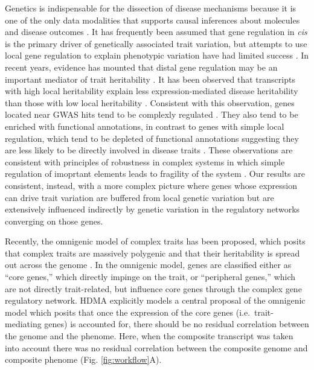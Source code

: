 \documentclass[
]{article}
\begin{document}
Genetics is indispensable for the dissection of disease mechanisms
because it is one of the only data modalities that supports causal
inferences about molecules and disease outcomes \cite{pmid38632401, 
pmid27855690}. It has frequently been assumed that gene regulation in
\textit{cis} is the primary driver of genetically associated trait
variation, but attempts to use local gene regulation to explain
phenotypic variation have had limited success
\cite{pmid32912663, pmid36515579}. In recent years, evidence has mounted
that distal gene regulation may be an important mediator of trait
heritability \cite{pmid32424349, 
pmid37857933, pmid31051098}. It has been observed that transcripts with
high local heritability explain less expression-mediated disease
heritability than those with low local heritability \cite{pmid32424349}.
Consistent with this observation, genes located near GWAS hits tend to
be complexly regulated \cite{pmid37857933}. They also tend to be
enriched with functional annotations, in contrast to genes with simple
local regulation, which tend to be depleted of functional annotations
suggesting they are less likely to be directly involved in disease
traits \cite{pmid37857933}. These observations are consistent with
principles of robustness in complex systems in which simple regulation
of imoprtant elements leads to fragility of the system
\cite{pmid29782925, pmid12082173, pmid27304973}. Our results are
consistent, instead, with a more complex picture where genes whose
expression can drive trait variation are buffered from local genetic
variation but are extensively influenced indirectly by genetic variation
in the regulatory networks converging on those genes.

Recently, the omnigenic model of complex traits has been proposed, which
posits that complex traits are massively polygenic and that their
heritability is spread out across the genome \cite{pmid28622505}. In the
omnigenic model, genes are classified either as ``core genes,'' which
directly impinge on the trait, or ``peripheral genes,'' which are not
directly trait-related, but influence core genes through the complex
gene regulatory network. HDMA explicitly models a central proposal of
the omnigenic model which posits that once the expression of the core
genes (i.e.~trait-mediating genes) is accounted for, there should be no
residual correlation between the genome and the phenome. Here, when the
composite transcript was taken into account there was no residual
correlation between the composite genome and composite phenome (Fig.
\ref{fig:workflow}A).
\end{document}
